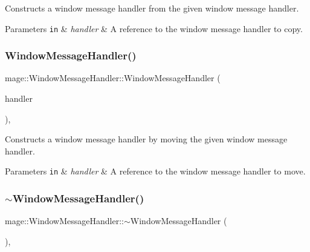 Constructs a window message handler from the given window message handler.


\begin{DoxyParams}[1]{Parameters}
\mbox{\tt in}  & {\em handler} & A reference to the window message handler to copy. \\
\hline
\end{DoxyParams}
\mbox{\label{classmage_1_1_window_message_handler_ab6fe3eac35ef7262941dae8e65841d88}} 
\subsubsection{\texorpdfstring{Window\+Message\+Handler()}{WindowMessageHandler()}\hspace{0.1cm}{\footnotesize\ttfamily [3/3]}}
{\footnotesize\ttfamily mage\+::\+Window\+Message\+Handler\+::\+Window\+Message\+Handler (\begin{DoxyParamCaption}\item[{\mbox{\hyperlink{classmage_1_1_window_message_handler}{Window\+Message\+Handler}} \&\&}]{handler }\end{DoxyParamCaption})\hspace{0.3cm}{\ttfamily [default]}, {\ttfamily [noexcept]}}

Constructs a window message handler by moving the given window message handler.


\begin{DoxyParams}[1]{Parameters}
\mbox{\tt in}  & {\em handler} & A reference to the window message handler to move. \\
\hline
\end{DoxyParams}
\mbox{\label{classmage_1_1_window_message_handler_a24eae1a24e783b22fce2c7fdd8e14fef}} 
\subsubsection{\texorpdfstring{$\sim$\+Window\+Message\+Handler()}{~WindowMessageHandler()}}
{\footnotesize\ttfamily mage\+::\+Window\+Message\+Handler\+::$\sim$\+Window\+Message\+Handler (\begin{DoxyParamCaption}{ }\end{DoxyParamCaption})\hspace{0.3cm}{\ttfamily [virtual]}, {\ttfamily [default]}}


